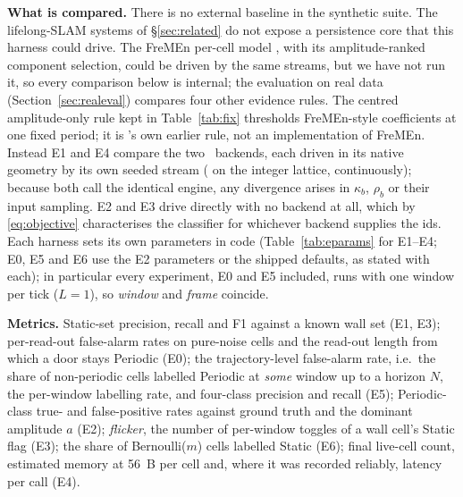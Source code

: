 \noindent\textbf{What is compared.} There is no external baseline in the synthetic suite. The lifelong-SLAM systems of \S\ref{sec:related} do not expose a persistence core that this harness could drive. The FreMEn per-cell model \citep{krajnik2017fremen,krajnik2016persistent,fremenrepo}, with its amplitude-ranked component selection, could be driven by the same streams, but we have not run it, so every comparison below is internal; the evaluation on real data (Section~\ref{sec:realeval}) compares four other evidence rules. The centred amplitude-only rule kept in Table~\ref{tab:fix} thresholds FreMEn-style coefficients at one fixed period; it is \sname's own earlier rule, not an implementation of FreMEn. Instead E1 and E4 compare the two \sname\ backends, each driven in its native geometry by its own seeded stream ( on the integer lattice,  continuously); because both call the identical engine, any divergence arises in $\kappa_b$, $\rho_b$ or their input sampling. E2 and E3 drive  directly with no backend at all, which by \eqref{eq:objective} characterises the classifier for whichever backend supplies the ids. Each harness sets its own parameters in code (Table~\ref{tab:eparams} for E1--E4; E0, E5 and E6 use the E2 parameters or the shipped defaults, as stated with each); in particular every experiment, E0 and E5 included, runs with one window per tick ($L{=}1$), so \emph{window} and \emph{frame} coincide.

\noindent\textbf{Metrics.} Static-set precision, recall and F1 against a known wall set (E1, E3); per-read-out false-alarm rates on pure-noise cells and the read-out length from which a door stays Periodic (E0); the trajectory-level false-alarm rate, i.e.\ the share of non-periodic cells labelled Periodic at \emph{some} window up to a horizon $N$, the per-window labelling rate, and four-class precision and recall (E5); Periodic-class true- and false-positive rates against ground truth and the dominant amplitude $a$ (E2); \emph{flicker}, the number of per-window toggles of a wall cell's Static flag (E3); the share of Bernoulli($m$) cells labelled Static (E6); final live-cell count, estimated memory at 56~B per cell and, where it was recorded reliably, latency per  call (E4).

